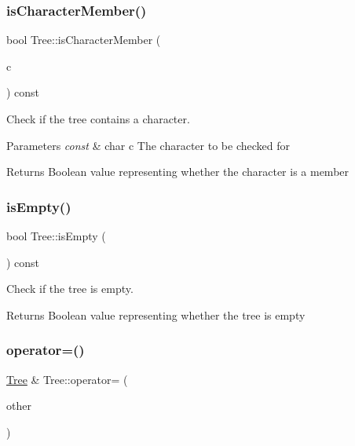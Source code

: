 \subsubsection{\texorpdfstring{isCharacterMember()}{isCharacterMember()}}
{\footnotesize\ttfamily bool Tree\+::is\+Character\+Member (\begin{DoxyParamCaption}\item[{const char}]{c }\end{DoxyParamCaption}) const}



Check if the tree contains a character. 


\begin{DoxyParams}{Parameters}
{\em const} & char c The character to be checked for \\
\hline
\end{DoxyParams}
\begin{DoxyReturn}{Returns}
Boolean value representing whether the character is a member 
\end{DoxyReturn}
\mbox{\label{class_tree_a555c9f251517225769a022db5987ef47}} 
\subsubsection{\texorpdfstring{isEmpty()}{isEmpty()}}
{\footnotesize\ttfamily bool Tree\+::is\+Empty (\begin{DoxyParamCaption}{ }\end{DoxyParamCaption}) const}



Check if the tree is empty. 

\begin{DoxyReturn}{Returns}
Boolean value representing whether the tree is empty 
\end{DoxyReturn}
\mbox{\label{class_tree_aaeb1ef0af85ad2c40d332b156583653f}} 
\subsubsection{\texorpdfstring{operator=()}{operator=()}}
{\footnotesize\ttfamily \mbox{\hyperlink{class_tree}{Tree}} \& Tree\+::operator= (\begin{DoxyParamCaption}\item[{\mbox{\hyperlink{class_tree}{Tree}}}]{other }\end{DoxyParamCaption})}




